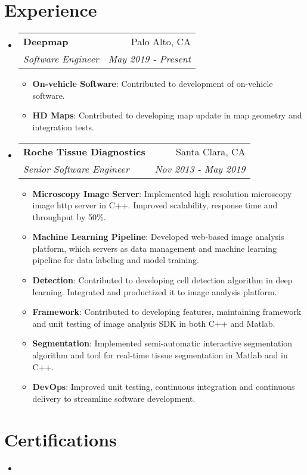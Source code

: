 \documentclass[letterpaper,12pt]{article}
\makeatletter
\newcommand{\resumeItem}[2]{
  \item\small{
    \textbf{#1}{: #2 \vspace{-2pt}}
  }
}
\newcommand{\resumeSubheading}[4]{
  \vspace{-1pt}\item
    \begin{tabular*}{0.97\textwidth}{l@{\extracolsep{\fill}}r}
      \textbf{#1} & #2 \\
      \textit{\small#3} & \textit{\small #4} \\
    \end{tabular*}\vspace{-5pt}
}
\newcommand{\resumeSubHeadingListStart}{\begin{itemize}[leftmargin=*]}
\newcommand{\resumeSubHeadingListEnd}{\end{itemize}}
\newcommand{\resumeItemListStart}{\begin{itemize}}
\newcommand{\resumeItemListEnd}{\end{itemize}\vspace{-5pt}}
\makeatother
\begin{document}
\section{Experience}
  \resumeSubHeadingListStart
    \resumeSubheading
      {Deepmap}{Palo Alto, CA}
      {Software Engineer}{May 2019 - Present}
      \resumeItemListStart
        \resumeItem{On-vehicle Software}
          {Contributed to development of on-vehicle software.}
        \resumeItem{HD Maps}
          {Contributed to developing map update in map geometry and integration tests.}
      \resumeItemListEnd
    \resumeSubheading
      {Roche Tissue Diagnostics}{Santa Clara, CA}
      {Senior Software Engineer}{Nov 2013 - May 2019}
      \resumeItemListStart
        \resumeItem{Microscopy Image Server}
          {Implemented high resolution microscopy image http server in C++. Improved scalability, response time and throughput by 50\%.}
        \resumeItem{Machine Learning Pipeline}
          {Developed web-based image analysis platform, which servers as data management and machine learning pipeline for data labeling and model training. }
        \resumeItem{Detection}
          {Contributed to developing cell detection algorithm in deep learning. Integrated and productized it to image analysis platform.}
        \resumeItem{Framework}
          {Contributed to developing features, maintaining framework and unit testing of image analysis SDK in both C++ and Matlab.}
        \resumeItem{Segmentation}
          {Implemented semi-automatic interactive segmentation algorithm and tool for real-time tissue segmentation in Matlab and in C++.}
        \resumeItem{DevOps}
          {Improved unit testing, continuous integration and continuous delivery to streamline software development.}
      \resumeItemListEnd
  \resumeSubHeadingListEnd

\section{Certifications}
  \resumeSubHeadingListStart
    \item[]{
    }
  \resumeSubHeadingListEnd
\end{document}
